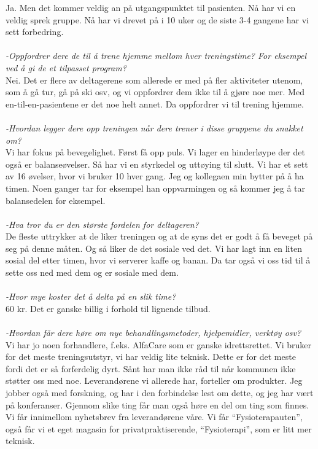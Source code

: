 Ja. Men det kommer veldig an på utgangspunktet til pasienten. Nå har vi en veldig sprek gruppe. Nå har vi drevet på i 10 uker og de siste 3-4 gangene har vi sett forbedring. \\ \\
\emph{-Oppfordrer dere de til å trene hjemme mellom hver treningstime? For eksempel ved å gi de et tilpasset program?}\\
Nei. Det er flere av deltagerene som allerede er med på fler aktiviteter utenom, som å gå tur, gå på ski osv, og vi oppfordrer dem ikke til å gjøre noe mer. Med en-til-en-pasientene er det noe helt annet. Da oppfordrer vi til trening hjemme. \\ \\
\emph{-Hvordan legger dere opp treningen når dere trener i disse gruppene du snakket om?} \\
Vi har fokus på bevegelighet. Først få opp puls. Vi lager en hinderløype der det også er balanseøvelser. Så har vi en styrkedel og uttøying til slutt. Vi har et sett av 16 øvelser, hvor vi bruker 10 hver gang. Jeg og kollegaen min bytter på å ha timen. Noen ganger tar for eksempel han oppvarmingen og så kommer jeg å tar balansedelen for eksempel. \\ \\
\emph{-Hva tror du er den største fordelen for deltageren?}\\
De fleste uttrykker at de liker treningen og at de syns det er godt å få beveget på seg på denne måten. Og så liker de det sosiale ved det. Vi har lagt inn en liten sosial del etter timen, hvor vi serverer kaffe og banan. Da tar også vi oss tid til å sette oss ned med dem og er sosiale med dem. \\ \\
\emph{-Hvor mye koster det å delta på en slik time?}\\
60 kr. Det er ganske billig i forhold til lignende tilbud. \\ \\
\emph{-Hvordan får dere høre om nye behandlingsmetoder, hjelpemidler, verktøy osv?} \\
Vi har jo noen forhandlere, f.eks. AlfaCare som er ganske idrettsrettet. Vi bruker for det meste treningsutstyr, vi har veldig lite teknisk. Dette er for det meste fordi det er så forferdelig dyrt. Sånt har man ikke råd til når kommunen ikke støtter oss med noe. Leverandørene vi allerede har, forteller om produkter. Jeg jobber også med forskning, og har i den forbindelse lest om dette, og jeg har vært på konferanser. Gjennom slike ting får man også høre en del om ting som finnes. Vi får innimellom nyhetsbrev fra leverandørene våre. Vi får “Fysioterapauten”, også får vi et eget magasin for privatpraktiserende, “Fysioterapi”, som er litt mer teknisk. \\ \\
